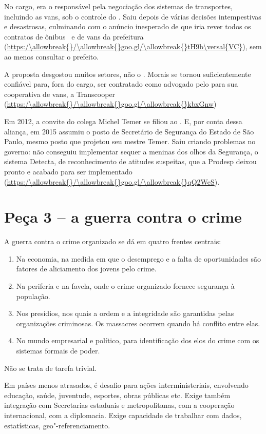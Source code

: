 No cargo, era o responsável pela negociação dos sistemas de transportes,
incluindo as vans, sob o controle do . Saiu depois de várias decisões
intempestivas e desastrosas, culminando com o anúncio inesperado de que
iria rever todos os contratos de ônibus~ e de vans da prefeitura
(\url{https:/\allowbreak{}/\allowbreak{}goo.gl/\allowbreak{}tH9b\versal{VC})}, sem ao menos consultar o prefeito.

A proposta desgostou muitos setores, não o . Morais se tornou
suficientemente confiável para, fora do cargo, ser contratado como
advogado pelo  para sua cooperativa de vans, a Transcooper
(\url{https:/\allowbreak{}/\allowbreak{}goo.gl/\allowbreak{}kbxGnw})

Em 2012, a convite do colega Michel Temer se filiou ao . E, por
conta dessa aliança, em 2015 assumiu o posto de Secretário de Segurança
do Estado de São Paulo, mesmo posto que projetou seu mestre Temer. Saiu
criando problemas no governo: não conseguiu implementar sequer a meninas
dos olhos da Segurança, o sistema Detecta, de reconhecimento de atitudes
suspeitas, que a Prodesp deixou pronto e acabado para ser implementado
(\url{https:/\allowbreak{}/\allowbreak{}goo.gl/\allowbreak{}qQ2WeS}).

\section{Peça 3 -- a guerra contra o crime}

A guerra contra o crime organizado se dá em quatro frentes centrais:

\begin{enumerate}
\itemsep1pt\parskip0pt
\item
  Na economia, na medida em que o desemprego e a falta de oportunidades
  são fatores de aliciamento dos jovens pelo crime.
\item
  Na periferia e na favela, onde o crime organizado fornece segurança à
  população.
\item
  Nos presídios, nos quais a ordem e a integridade são garantidas pelas
  organizações criminosas. Os massacres ocorrem quando há conflito entre
  elas.
\item
  No mundo empresarial e político, para identificação dos elos do crime
  com os sistemas formais de poder.
\end{enumerate}

Não se trata de tarefa trivial.

Em países menos atrasados, é desafio para ações interministeriais,
envolvendo educação, saúde, juventude, esportes, obras públicas etc.
Exige também integração com Secretarias estaduais e metropolitanas, com
a cooperação internacional, com a diplomacia. Exige capacidade de
trabalhar com dados, estatísticas, geo"-referenciamento.

